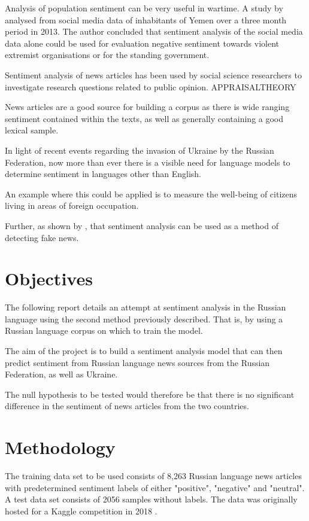 \documentclass[12pt]{article}
\begin{document}
Analysis of population sentiment can be very useful in wartime. A study by \citet{yemenSocial} analysed from social media data of inhabitants of Yemen over a three month period in 2013. The author concluded that sentiment analysis of the social media data alone could be used for evaluation negative sentiment towards violent extremist organisations or for the standing government.

Sentiment analysis of news articles has been used by social science researchers to investigate research questions related to public opinion. APPRAISALTHEORY

News articles are a good source for building a corpus as there is wide ranging sentiment contained within the texts, as well as generally containing a good lexical sample.

In light of recent events regarding the invasion of Ukraine by the Russian Federation, now more than ever there is a visible need for language models to determine sentiment in languages other than English.

An example where this could be applied is to measure the well-being of citizens living in areas of foreign occupation. 

Further, as shown by \citet{fakeNews}, that sentiment analysis can be used as a method of detecting fake news.

\section{Objectives}

The following report details an attempt at sentiment analysis in the Russian language using the second method previously described. That is, by using a Russian language corpus on which to train the model.

The aim of the project is to build a sentiment analysis model that can then predict sentiment from Russian language news sources from the Russian Federation, as well as Ukraine.

The null hypothesis to be tested would therefore be that there is no significant difference in the sentiment of news articles from the two countries.

\section{Methodology}

The training data set to be used consists of 8,263 Russian language news articles with predetermined sentiment labels of either "positive", "negative" and "neutral". A test data set consists of 2056 samples without labels. The data was originally hosted for a Kaggle competition in 2018 \parencite{dataset}.
\end{document}
